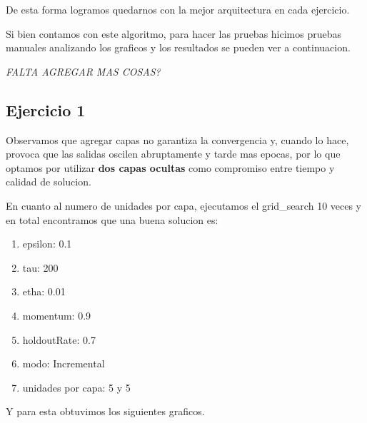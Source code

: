 De esta forma logramos quedarnos con la mejor arquitectura en cada ejercicio. 

Si bien contamos con este algoritmo, para hacer las pruebas hicimos pruebas manuales analizando los graficos y los resultados se pueden ver a continuacion.

\emph{\color{red} FALTA AGREGAR MAS COSAS?}
\subsection{Ejercicio 1}

Observamos que agregar capas no garantiza la convergencia y, cuando lo hace, provoca que las salidas oscilen abruptamente y tarde mas epocas, por lo que optamos por utilizar \textbf{dos capas ocultas} como compromiso entre tiempo y calidad de solucion. 


En cuanto al numero de unidades por capa, ejecutamos el grid\_search 10 veces y en total encontramos que una buena solucion es:

\begin{enumerate}
\item epsilon: 0.1
\item tau: 200
\item etha: 0.01
\item momentum: 0.9
\item holdoutRate: 0.7
\item modo: Incremental
\item unidades por capa: 5 y 5
\end{enumerate}

Y para esta obtuvimos los siguientes graficos.


